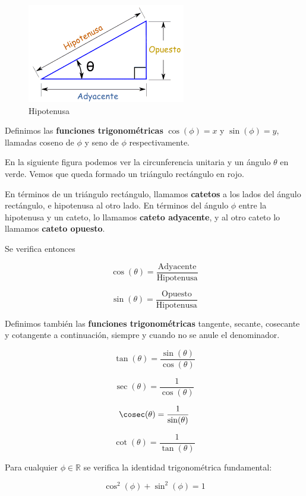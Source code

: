 \begin{figure}[h]
\centering\includegraphics[scale=0.6]{images/01_precalculo/hipotenusa.png}
\caption{Hipotenusa}
\end{figure}

\begin{definition}
Definimos las \textbf{funciones trigonométricas} $\cos(\phi) = x$ y $\sin(\phi) = y$, llamadas coseno de $\phi$ y seno de $\phi$ respectivamente.

En la siguiente figura podemos ver la circunferencia unitaria y un ángulo $\theta$ en verde.  Vemos que queda formado un triángulo rectángulo en rojo.


En términos de un triángulo rectángulo, llamamos \textbf{catetos} a los lados del ángulo rectángulo, e hipotenusa al otro lado.  En términos del ángulo $\phi$ entre la hipotenusa y un cateto, lo llamamos \textbf{cateto adyacente}, y al otro cateto lo llamamos \textbf{cateto opuesto}.

Se verifica entonces

$$\cos(\theta) = \frac{\textrm{Adyacente}}{\textrm{Hipotenusa}}$$

$$\sin(\theta) = \frac{\textrm{Opuesto}}{\textrm{Hipotenusa}}$$

Definimos también las \textbf{funciones trigonométricas} tangente, secante, cosecante y cotangente a continuación, siempre y cuando no se anule el denominador.

$$ \tan(\theta) = \frac{\sin(\theta)}{\cos(\theta)}$$

$$ \sec(\theta) = \frac{1}{\cos(\theta)}$$

$$ \cosec(\theta) = \frac{1}{\sin(\theta)}$$

$$ \cot(\theta) = \frac{1}{\tan(\theta)}$$

\end{definition}

\begin{observation} 
Para cualquier $\phi \in \mathbb{R}$ se verifica la identidad trigonométrica fundamental:

$$ \cos^2(\phi) + \sin^2(\phi) = 1$$
\end{observation}

